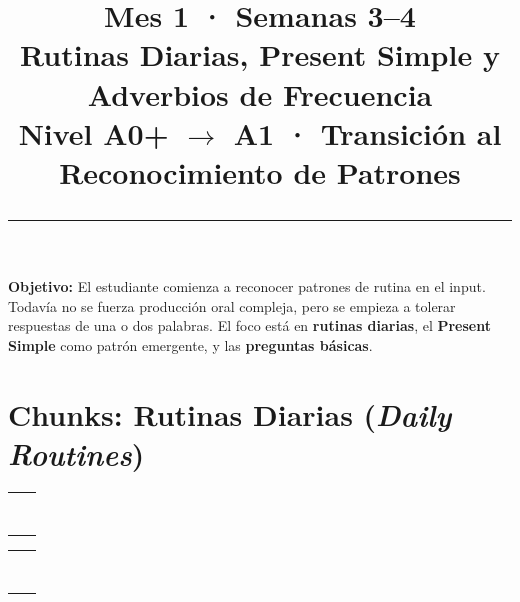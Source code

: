 \documentclass[12pt,a4paper]{article}
\title{%
  \vspace{-1cm}
  {\Huge\bfseries\textcolor{mes1}{Mes 1 · Semanas 3--4}}\\[0.3cm]
  {\Large Rutinas Diarias, Present Simple y Adverbios de Frecuencia}\\[0.2cm]
  {\large\color{grissuave} Nivel A0+ $\rightarrow$ A1 · Transición al Reconocimiento de Patrones}\\[0.5cm]
  \rule{\textwidth}{1.5pt}
}
\author{}
\date{}
\begin{document}
\maketitle
\thispagestyle{empty}

\begin{cajanivel}
\textbf{Objetivo:} El estudiante comienza a reconocer patrones de rutina en el input. Todavía no se fuerza producción oral compleja, pero se empieza a tolerar respuestas de una o dos palabras. El foco está en \textbf{rutinas diarias}, el \textbf{Present Simple} como patrón emergente, y las \textbf{preguntas básicas}.
\end{cajanivel}

\section{Chunks: Rutinas Diarias (\textit{Daily Routines})}

\begin{cajachunk}
\begin{tabularx}{\textwidth}{@{} X l @{}}
\eng{I wake up at 7 o'clock.} & \esp{Me despierto a las 7.} \\
\eng{I get up.} & \esp{Me levanto.} \\
\eng{I take a shower.} & \esp{Me ducho.} \\
\eng{I brush my teeth.} & \esp{Me lavo los dientes.} \\
\eng{I get dressed.} & \esp{Me visto.} \\
\eng{I have breakfast.} & \esp{Desayuno.} \\
\eng{I drink coffee.} & \esp{Bebo café.} \\
\eng{I go to work / school.} & \esp{Voy al trabajo / a la escuela.} \\
\end{tabularx}
\end{cajachunk}

\begin{cajachunk}
\begin{tabularx}{\textwidth}{@{} X l @{}}
\eng{I have lunch at noon.} & \esp{Almuerzo al mediodía.} \\
\eng{I come home.} & \esp{Llego a casa.} \\
\eng{I cook dinner.} & \esp{Cocino la cena.} \\
\eng{I watch TV.} & \esp{Veo televisión.} \\
\eng{I read a book.} & \esp{Leo un libro.} \\
\eng{I do my homework.} & \esp{Hago mi tarea.} \\
\eng{I go to bed at 10.} & \esp{Me acuesto a las 10.} \\
\eng{I fall asleep.} & \esp{Me duermo.} \\
\end{tabularx}
\end{cajachunk}
\end{document}
